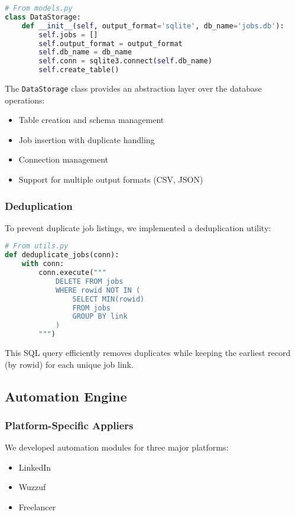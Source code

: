 \documentclass[12pt,a4paper]{article}
\begin{document}
\begin{lstlisting}[language=Python, caption=DataStorage Implementation]
# From models.py
class DataStorage:
    def __init__(self, output_format='sqlite', db_name='jobs.db'):
        self.jobs = []
        self.output_format = output_format
        self.db_name = db_name
        self.conn = sqlite3.connect(self.db_name)
        self.create_table()
\end{lstlisting}

The \texttt{DataStorage} class provides an abstraction layer over the database operations:
\begin{itemize}
    \item Table creation and schema management
    \item Job insertion with duplicate handling
    \item Connection management
    \item Support for multiple output formats (CSV, JSON)
\end{itemize}

\subsubsection{Deduplication}
To prevent duplicate job listings, we implemented a deduplication utility:

\begin{lstlisting}[language=Python, caption=Deduplication Implementation]
# From utils.py
def deduplicate_jobs(conn):
    with conn:
        conn.execute("""
            DELETE FROM jobs
            WHERE rowid NOT IN (
                SELECT MIN(rowid)
                FROM jobs
                GROUP BY link
            )
        """)
\end{lstlisting}

This SQL query efficiently removes duplicates while keeping the earliest record (by rowid) for each unique job link.

\subsection{Automation Engine}

\subsubsection{Platform-Specific Appliers}
We developed automation modules for three major platforms:
\begin{itemize}
    \item LinkedIn
    \item Wuzzuf
    \item Freelancer
\end{itemize}
\end{document}
